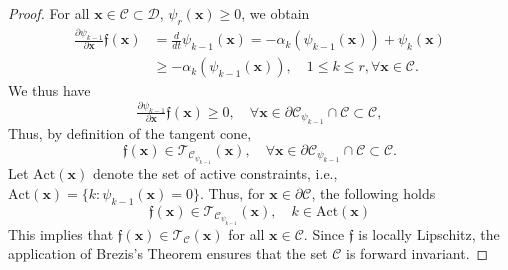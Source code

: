 \documentclass[letterpaper, 10 pt, journal, twoside]{IEEEtran}
\theoremstyle{plain}
\newcommand{\myvar}[1]{\bm{#1}}
\newcommand{\myvarfrak}[1]{\bm{\mathfrak{#1}}}
\newcommand{\myset}[1]{\mathscr{#1}}
\begin{document}
\begin{proof}
For all $\myvar{x} \in \myset{C} \subset\myset{D}$, $\psi_r(\myvar{x}) \ge 0$, we obtain
\begin{equation*} \label{eq:nagumo_vector_dirc}
    \begin{aligned}
    \tfrac{\partial \psi_{k-1}}{\partial \myvar{x}} \myvarfrak{f} (\myvar{x})  & = \tfrac{d}{dt} \psi_{k-1}(\myvar{x}) = - \alpha_{k}(\psi_{k-1}(\myvar{x})) + \psi_{k}(\myvar{x}) \\ &\ge  - \alpha_{k}(\psi_{k-1}(\myvar{x})), 
 \quad   1 \le k \le r, \forall \myvar{x} \in \myset{C}.
    \end{aligned}
\end{equation*} 
We thus have
\begin{equation*}
\tfrac{\partial \psi_{k-1}}{\partial \myvar{x}} \myvarfrak{f} (\myvar{x})  \ge 0, \quad \forall \myvar{x} \in \partial \myset{C}_{\psi_{k-1}} \cap \myset{C} \subset \myset{C},
\end{equation*}
Thus, by definition of the tangent cone,
\begin{equation*} \label{eq:sub_tang_condition}
\myvarfrak{f} (\myvar{x}) \in \mathcal{T}_{\myset{C}_{\psi_{k-1}}}(\myvar{x}), \quad \forall \myvar{x} \in \partial \myset{C}_{\psi_{k-1}} \cap \myset{C} \subset \myset{C}.
\end{equation*}
{Let} $\text{Act}(\myvar{x})$ {denote} the set of active constraints{, i.e., }$\text{Act}(\myvar{x}) = \{k : \psi_{k-1}(\myvar{x}) = 0\}$. Thus, for $\myvar{x} \in \partial  \myset{C}$, the following holds
\begin{equation*}
    \myvarfrak{f} (\myvar{x}) \in \mathcal{T}_{\myset{C}_{\psi_{k-1}}}(\myvar{x}), \quad k\in \text{Act}(\myvar{x})
\end{equation*}
{This implies that} $\myvarfrak{f} (\myvar{x}) \in \mathcal{T}_{\myset{C}}(\myvar{x})$ for all $\myvar{x}\in \myset{C}$. {Since} $\mathfrak{f}$ is  locally Lipschitz,  {the application of} Brezis's Theorem \cite[Theorem~4]{redheffer1972theorems} {ensures that} the set $\myset{C}$ is forward invariant.
\end{proof}
\end{document}
